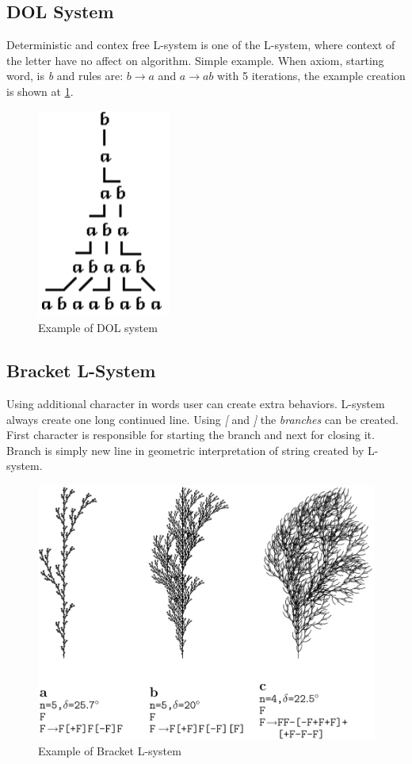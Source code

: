 \documentclass[b5paper,twoside,11pt]{article}
\begin{document}
\subsection*{DOL System}
Deterministic and contex free L-system is one of the L-system, where context of the letter have no affect on algorithm. Simple example. When axiom, starting word, is \textit{b} and rules are: $b \rightarrow a$ and $a \rightarrow ab$ with 5 iterations, the example creation is shown at \figurename\ref{DOL}.

\begin{figure}[!htp]
\centering
  \includegraphics[width=0.15\linewidth]{DOL-system}
\caption{Example of DOL system\cite{prusinABOP} \label{DOL}}
\end{figure}
\FloatBarrier
\subsection*{Bracket L-System}
Using additional character in words user can create extra behaviors. L-system always create one long continued line. Using \textit{[} and \textit{]} the \textit{branches} can be created. First character is responsible for starting the branch and next for closing it. Branch is simply new line in geometric interpretation of string created by L-system.
\begin{figure}[!htp]
\centering
  \includegraphics[width=0.7\linewidth]{branchingL}
\caption{Example of Bracket L-system\cite{prusinABOP} \label{branchingL}}
\end{figure}
\end{document}
